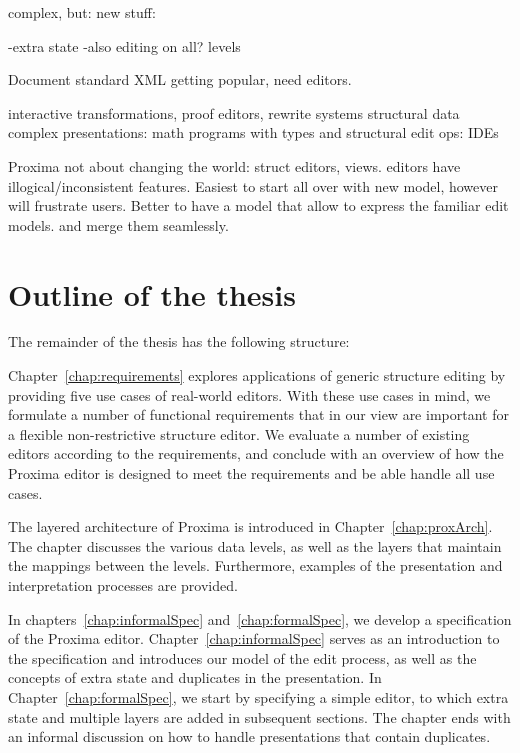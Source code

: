 %

\bc
complex, but:
new stuff:

-extra state
-also editing on all? levels

Document standard XML getting popular, need editors.

interactive transformations, proof editors, rewrite systems
structural data complex presentations: math
programs with types and structural edit ops: IDEs

Proxima not about changing the world: struct editors, views.  editors have illogical/inconsistent features. Easiest to start all over with new model, however will frustrate users. Better to have a model that allow to express the familiar edit models. and merge them seamlessly.
\ec


\section{Outline of the thesis}\label{sect:overview}

The remainder of the thesis has the following structure:

Chapter~\ref{chap:requirements} explores applications of generic structure editing by providing five use cases of real-world editors. With these use cases in mind, we formulate a number of functional requirements that in our view are important for a flexible non-restrictive structure editor. We evaluate a number of existing editors according to the requirements, and conclude with an overview of how the Proxima editor is designed to meet the requirements and be able handle all use cases.

The layered architecture of Proxima is introduced in Chapter~\ref{chap:proxArch}.  The chapter discusses the various data levels, as well as the layers that maintain the mappings between the levels. Furthermore,  examples of the presentation and interpretation processes are provided.

In chapters~\ref{chap:informalSpec} and~\ref{chap:formalSpec}, we develop a specification of the Proxima editor. Chapter~\ref{chap:informalSpec} serves as an introduction to the specification and introduces our model of the edit process, as well as the concepts of extra state and duplicates in the presentation. In  Chapter~\ref{chap:formalSpec}, we start by specifying a simple editor, to which extra state and multiple layers are added in subsequent sections. The chapter ends with an informal discussion on how to handle presentations that contain duplicates.

